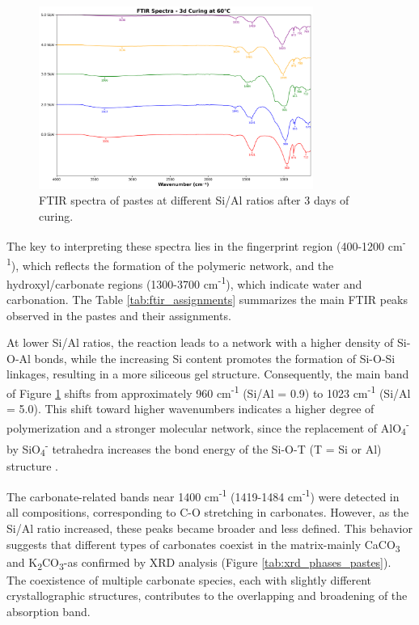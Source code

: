 \begin{figure}[H]
    \centering
    \includegraphics[width=0.8\textwidth]{Cap4/images/ftir_comparison_3d_curing.png}
    \caption{FTIR spectra of pastes at different Si/Al ratios after 3 days of curing.}
    \label{fig:ftir_pastes}
\end{figure}

The key to interpreting these spectra lies in the fingerprint region (400-1200 cm\textsuperscript{-1}), which reflects the formation of the polymeric network, and the hydroxyl/carbonate regions (1300-3700 cm\textsuperscript{-1}), which indicate water and carbonation.
The Table \ref{tab:ftir_assignments} summarizes the main FTIR peaks observed in the pastes and their assignments.

At lower Si/Al ratios, the reaction leads to a network with a higher density of Si-O-Al bonds, while the increasing Si content promotes the formation of Si-O-Si linkages, resulting in a more siliceous gel structure.
Consequently, the main band of Figure \ref{fig:ftir_pastes} shifts from approximately 960 cm\textsuperscript{-1} (Si/Al = 0.9) to 1023 cm\textsuperscript{-1} (Si/Al = 5.0).
This shift toward higher wavenumbers indicates a higher degree of polymerization and a stronger molecular network, since the replacement of AlO\textsubscript{4}\textsuperscript{-} by SiO\textsubscript{4}\textsuperscript{-} tetrahedra increases the bond energy of the Si-O-T (T = Si or Al) structure \cite{pachecotorgal2014handbook, ma2022calcium, provis2009geopolymers}.

The carbonate-related bands near 1400 cm\textsuperscript{-1} (1419-1484 cm\textsuperscript{-1}) were detected in all compositions, corresponding to C-O stretching in carbonates. However, as the Si/Al ratio increased, these peaks became broader and less defined. This behavior suggests that different types of carbonates coexist in the matrix-mainly CaCO\textsubscript{3} and K\textsubscript{2}CO\textsubscript{3}-as confirmed by XRD analysis (Figure \ref{tab:xrd_phases_pastes}). The coexistence of multiple carbonate species, each with slightly different crystallographic structures, contributes to the overlapping and broadening of the absorption band.

